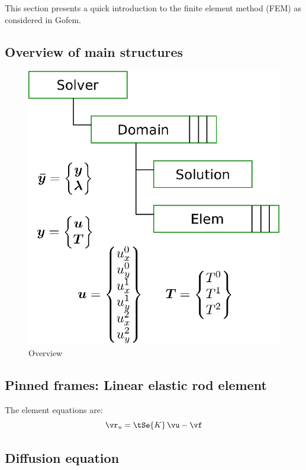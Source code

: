 \documentclass[twoside,journal]{IEEEtran}
\begin{document}
This section presents a quick introduction to the finite element method (FEM) as considered in
Gofem.

\subsection{Overview of main structures}


\begin{figure} \centering
\includegraphics[scale=0.7]{./figs/overview.eps}
\caption{Overview}
\label{fig:overview}
\end{figure}


\subsection{Pinned frames: Linear elastic rod element}

The element equations are:
\begin{equation}
\vr_u = \tSe{K} \, \vu - \vf
\end{equation}




\subsection{Diffusion equation}
\end{document}
